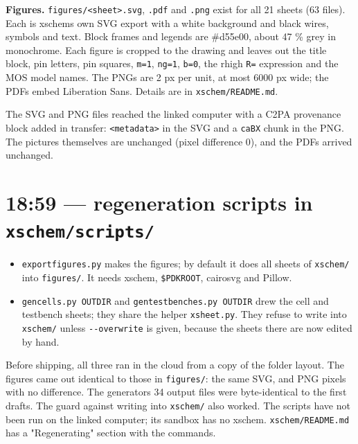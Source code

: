 \documentclass[11pt,a4paper]{article}
\providecommand{\tightlist}{\setlength{\itemsep}{0pt}\setlength{\parskip}{0pt}}
\renewcommand{\_}{\textunderscore\hspace{0pt}}
\begin{document}
\textbf{Figures.}
\texttt{figures/\textless{}sheet\textgreater{}.svg},
\texttt{.pdf} and \texttt{.png} exist for all 21
sheets (63 files). Each is
xschem\textquotesingle s own SVG export with a
white background and black wires, symbols and
text. Block frames and legends are \#d55e00, about
47 \% grey in monochrome. Each figure is cropped
to the drawing and leaves out the title block, pin
letters, pin squares, \texttt{m=1}, \texttt{ng=1},
\texttt{b=0}, the rhigh \texttt{R=} expression and
the MOS model names. The PNGs are 2 px per unit,
at most 6000 px wide; the PDFs embed Liberation
Sans. Details are in \texttt{xschem/README.md}.

The SVG and PNG files reached the linked computer
with a C2PA provenance block added in transfer:
\texttt{\textless{}metadata\textgreater{}} in the
SVG and a \texttt{caBX} chunk in the PNG. The
pictures themselves are unchanged (pixel
difference 0), and the PDFs arrived unchanged.

\hypertarget{1859--regeneration-scripts-in-xschemscripts}{%
\section{\texorpdfstring{18:59 --- regeneration
scripts in
\texttt{xschem/scripts/}}{18:59 --- regeneration scripts in xschem/scripts/}}\label{1859--regeneration-scripts-in-xschemscripts}}

\begin{itemize}
\tightlist
\item
  \texttt{export\_figures.py} makes the figures;
  by default it does all sheets of
  \texttt{xschem/} into \texttt{figures/}. It
  needs xschem, \texttt{\$PDK\_ROOT}, cairosvg and
  Pillow.
\item
  \texttt{gen\_cells.py\ OUTDIR} and
  \texttt{gen\_testbenches.py\ OUTDIR} drew the
  cell and testbench sheets; they share the helper
  \texttt{xsheet.py}. They refuse to write into
  \texttt{xschem/} unless \texttt{-\/-overwrite}
  is given, because the sheets there are now
  edited by hand.
\end{itemize}

Before shipping, all three ran in the cloud from a
copy of the folder layout. The figures came out
identical to those in \texttt{figures/}: the same
SVG, and PNG pixels with no difference. The
generators\textquotesingle{} 34 output files were
byte-identical to the first drafts. The guard
against writing into \texttt{xschem/} also worked.
The scripts have not been run on the linked
computer; its sandbox has no xschem.
\texttt{xschem/README.md} has a "Regenerating"
section with the commands.
\end{document}
